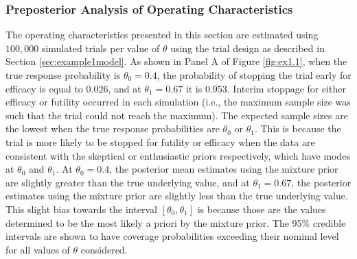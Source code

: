 \documentclass[AMA,STIX1COL,doublespace]{WileyNJD-v2}
\begin{document}
\subsubsection{Preposterior Analysis of Operating Characteristics}\label{sec:ex1.1}
The operating characteristics presented in this section are estimated using $100,000$ simulated trials per value of $\theta$ using the trial design as described in Section \ref{sec:example1model}. 
%
As shown in Panel A of Figure \ref{fig:ex1.1}, when the true response probability is $\theta_0=0.4$, the probability of stopping the trial early for efficacy is equal to $0.026$, and at $\theta_1=0.67$ it is $0.953$. 
%
Interim stoppage for either efficacy or futility occurred in each simulation (i.e., the maximum sample size was such that the trial could not reach the maximum). The expected sample sizes are the lowest when the true response probabilities are $\theta_0$ or $\theta_1$. This is because the trial is more likely to be stopped for futility or efficacy when the data are consistent with the skeptical or enthusiastic priors respectively, which have modes at $\theta_0$ and $\theta_1$. 
%
At $\theta_0=0.4$, the posterior mean estimates using the mixture prior are slightly greater than the true underlying value, and at $\theta_1=0.67$, the posterior estimates using the mixture prior are slightly less than the true underlying value. 
%
This slight bias towards the interval $[\theta_0,\theta_1]$ is because those are the values determined to be the most likely a priori by the mixture prior.
%
%
The 95\% credible intervals are shown to have coverage probabilities exceeding their nominal level for all values of $\theta$ considered.
%
\end{document}
